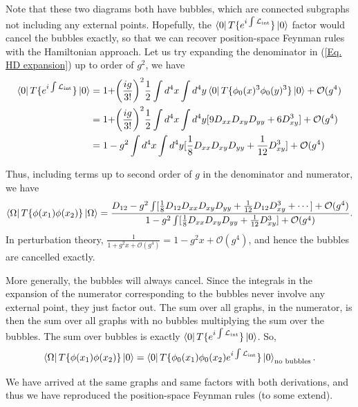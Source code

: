 \documentclass[11pt]{article}
\theoremstyle{definition}
\begin{document}
Note that these two diagrams both have bubbles, which are connected subgraphs not including any external points. Hopefully, the $\bra{0} T \{ e^{i \int \mathcal{L}_{\text{int}} }\}\ket{0}$ factor would cancel the bubbles exactly, so that we can recover position-space Feynman rules with the Hamiltonian approach. Let us try expanding the denominator in (\ref{Eq. HD expansion}) up to order of $g^2$, we have
\begin{equation}
\begin{aligned}
        \bra{0} T \{ e^{i \int \mathcal{L}_{\text{int}} }\}\ket{0} &= 1 + \biggr(\frac{ig}{3!}\biggr)^2 \frac{1}{2} \int d^4x \int d^4y \bra{0}T\{\phi_0(x)^3 \phi_0(y)^3\} \ket{0} + \mathcal{O}(g^4) \\
        &= 1 + \biggr(\frac{ig}{3!}\biggr)^2 \frac{1}{2} \int d^4x \int d^4y  [9D_{xx} D_{xy} D_{yy} + 6D_{xy}^3] + \mathcal{O}(g^4)\\
        &= 1 -g^2 \int d^4x \int d^4y  [\frac{1}{8}D_{xx} D_{xy} D_{yy} + \frac{1}{12}D_{xy}^3] + \mathcal{O}(g^4)
\end{aligned}
\end{equation}

Thus, including terms up to second order of $g$ in the denominator and numerator, we have
\begin{equation}
    \bra{\Omega} T \{ \phi(x_1) \phi(x_2) \} \ket{\Omega} = \frac{D_{12}-g^2 \int  [\frac{1}{8}D_{12}D_{xx} D_{xy} D_{yy} + \frac{1}{12}D_{12}D_{xy}^3 + \cdots] + \mathcal{O}(g^4)}{1 -g^2 \int  [\frac{1}{8}D_{xx} D_{xy} D_{yy} + \frac{1}{12}D_{xy}^3] + \mathcal{O}(g^4)}.
\end{equation}
 In perturbation theory, $\frac{1}{1+g^2x+\mathcal{O}(g^4)} =1-g^2x+\mathcal{O}(g^4)$, and hence the bubbles are cancelled exactly. 

 More generally, the bubbles will always cancel. Since the integrals in the expansion of the numerator corresponding to the bubbles never involve any external point, they just factor out. The sum over all graphs, in the numerator, is then the sum over all graphs with no bubbles multiplying the sum over the bubbles. The sum over bubbles is exactly $ \bra{0} T \{ e^{i \int \mathcal{L}_{\text{int}} }\}\ket{0}$. So,
\begin{equation}
    \bra{\Omega}T\{\phi(x_1)\phi(x_2)\}\ket{0} =  \bra{0} T \{\phi_0(x_1)\phi_0(x_2) e^{i \int \mathcal{L}_{\text{int}} }\}\ket{0}_{\text{no bubbles}}.
\end{equation}

We have arrived at the same graphs and same factors with both derivations, and thus we have reproduced the position-space Feynman rules (to some extend).
\end{document}
